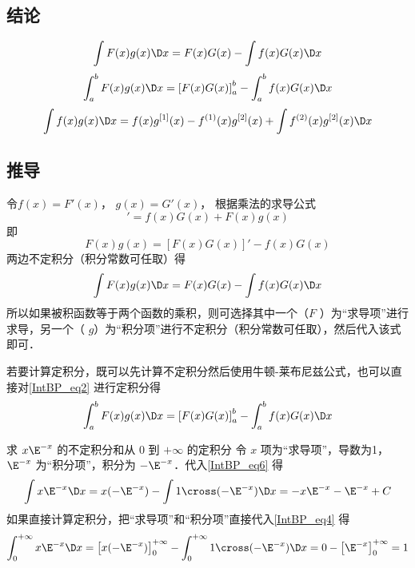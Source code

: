 

\subsection{结论}
\begin{equation}\label{IntBP_eq1}
\int {F(x)g(x)\D x}  = F(x)G(x) - \int {f(x)G(x)\D x}
\end{equation}
\begin{equation}
\int_a^b {F(x)g(x)\D x}  = \left[ {F(x)G(x)} \right]_a^b - \int_a^b {f(x)G(x)\D x}
\end{equation}
\begin{equation}
\int {f(x)g(x)\D x}  = f(x){g^{[1]}}(x) - {f^{(1)}}(x){g^{[2]}}(x) + \int {{f^{(2)}}(x){g^{[2]}}(x)\D x}
\end{equation}

\subsection{推导}
令$f(x) = F'(x)$，  $g(x) = G'(x)$， 根据乘法的求导公式%
\begin{equation}
[F(x)G(x)]' = f(x)G(x) + F(x)g(x)
\end{equation}
即
\begin{equation}\label{IntBP_eq2}
F(x)g(x) = [F(x)G(x)]' - f(x)G(x)
\end{equation}
两边不定积分（积分常数可任取）得
\begin{equation}\label{IntBP_eq6}
\int {F(x)g(x)\D x}  = F(x)G(x) - \int {f(x)G(x)\D x}
\end{equation}
所以如果被积函数等于两个函数的乘积，则可选择其中一个（$F$ ）为“求导项”进行求导，另一个（ $g$）为“积分项”进行不定积分（积分常数可任取），然后代入该式即可．

若要计算定积分，既可以先计算不定积分然后使用牛顿-莱布尼兹公式，也可以直接对\autoref{IntBP_eq2} 进行定积分得
\begin{equation}\label{IntBP_eq4}
\int_a^b {F(x)g(x)\D x}  = \left[ {F(x)G(x)} \right]_a^b - \int_a^b {f(x)G(x)\D x}
\end{equation}

\begin{exam}{求 $x{\E^{ - x}}$ 的不定积分和从 $0$ 到 $+\infty$ 的定积分}
令 $x$ 项为“求导项”，导数为1， ${\E^{ - x}}$ 为“积分项”，积分为 $- {\E^{ - x}}$．代入\autoref{IntBP_eq6} 得
\begin{equation}
\int {x{\E^{ - x}}\D x}  = x( - {\E^{ - x}}) - \int {1 \cross ( - {\E^{ - x}})\D x}  =  - x{\E^{ - x}} - {\E^{ - x}} + C
\end{equation}
如果直接计算定积分，把“求导项”和“积分项”直接代入\autoref{IntBP_eq4} 得
\begin{equation}
\int_0^{ + \infty } {x{\E^{ - x}}\D x}  = \left[ {x( - {\E^{ - x}})} \right]_0^{ + \infty } - \int_0^{ + \infty } {1 \cross ( - {\E^{ - x}})\D x}  = 0 - \left[ {{\E^{ - x}}} \right]_0^{ + \infty } = 1
\end{equation}
\end{exam}

